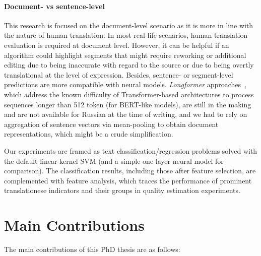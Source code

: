 \paragraph{Document- vs sentence-level} This research is focused on the document-level scenario as it is more in line with the nature of human translation. In most real-life scenarios, human translation evaluation is required at document level. 
However, it can be helpful if an algorithm could highlight segments that might require reworking or additional editing due to being inaccurate with regard to the source or due to being overtly translational at the level of expression. Besides, sentence- or segment-level predictions are more compatible with neural models. \textit{Longformer} approaches~\cite{Beltagy2020}, which address the known difficulty of Transformer-based architectures to process sequences longer than 512 token (for BERT-like models), are still in the making and are not available for Russian at the time of writing, and we had to rely on aggregation of sentence vectors via mean-pooling to obtain document representations, which might be a crude simplification.

Our experiments are framed as text classification/regression problems solved with the default linear-kernel \gls{SVM} (and a simple one-layer neural model for comparison). The classification results, including those after feature selection, are complemented with feature analysis, which traces the performance of prominent translationese indicators and their groups in quality estimation experiments.

\section{\label{sec:contributions}Main Contributions}

The main contributions of this PhD thesis are as follows: 

